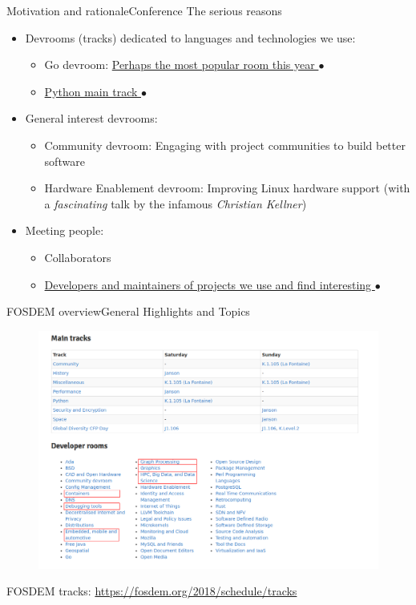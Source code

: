 \documentclass[10pt]{beamer}
\begin{document}
\begin{frame}{Motivation and rationale}{Conference}
    The serious reasons
    \begin{itemize}
        \item Devrooms (tracks) dedicated to languages and technologies we use:
            \begin{itemize}
                \item Go devroom: \href{run:./photos/go-devroom-queue.jpg}{Perhaps the most popular room this year $\bullet$}
                \item \href{run:./photos/python-talk.jpg}{Python main track $\bullet$}
            \end{itemize}
        \item General interest devrooms:
            \begin{itemize}
                \item Community devroom: Engaging with project communities to build better software
                \item Hardware Enablement devroom: Improving Linux hardware support (with a \emph{fascinating} talk by the infamous \emph{Christian Kellner})
            \end{itemize}
        \item Meeting people:
            \begin{itemize}
                \item Collaborators
                \item \href{run:./photos/collab.jpg}{Developers and maintainers of projects we use and find interesting $\bullet$}
            \end{itemize}
    \end{itemize}
\end{frame}

\begin{frame}{FOSDEM overview}{General Highlights and Topics}
    \begin{figure}
        \includegraphics[width=\textwidth]{tracks-devrooms.png}
    \end{figure}

    FOSDEM tracks: \url{https://fosdem.org/2018/schedule/tracks}
\end{frame}
\end{document}
